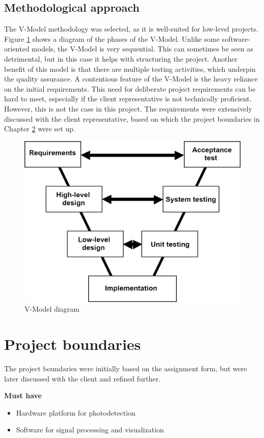 \documentclass{report}
\begin{document}
	\section{Methodological approach}\label{methodological_approach}
	The V-Model methodology was selected, as it is well-suited for low-level projects. Figure \ref{fig:vmodel} shows a diagram of the phases of the V-Model. Unlike some software-oriented models, the V-Model is very sequential. This can sometimes be seen as detrimental, but in this case it helps with structuring the project. Another benefit of this model is that there are multiple testing activities, which underpin the quality assurance. A contentious feature of the V-Model is the heavy reliance on the initial requirements. This need for deliberate project requirements can be hard to meet, especially if the client representative is not technically proficient. However, this is not the case in this project. The requirements were extensively discussed with the client representative, based on which the project boundaries in Chapter \ref{project_boundaries} were set up.
	
	\begin{figure}[ht]
		\centering
		\includegraphics[width=0.7\linewidth]{img/vmodel}
		\caption{V-Model diagram}
		\label{fig:vmodel}
	\end{figure}

	\chapter{Project boundaries} \label{project_boundaries}
	The project boundaries were initially based on the assignment form, but were later discussed with the client and refined further. 
	
	\textbf{Must have}
	\begin{itemize}
		\item Hardware platform for photodetection
		\item Software for signal processing and visualization
	\end{itemize}
	
\end{document}
